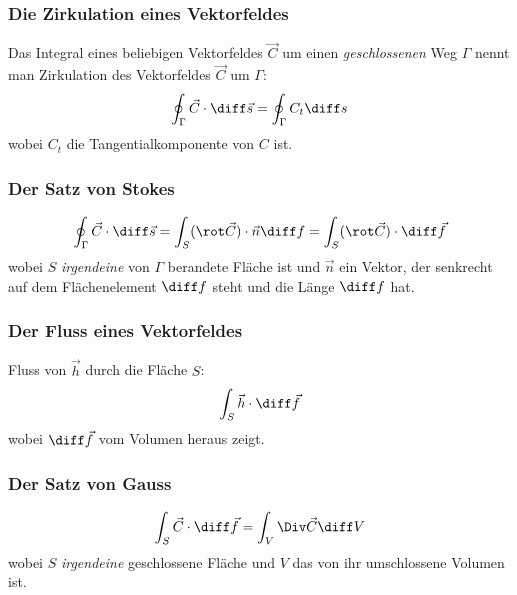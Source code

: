 		
		\subsubsection{Die Zirkulation eines Vektorfeldes} %
			
			Das Integral eines beliebigen Vektorfeldes $\vec{C}$ um einen \emph{geschlossenen} Weg $\Gamma$ nennt man Zirkulation des Vektorfeldes $\vec{C}$ um $\Gamma$:
			\[
				\oint_{\Gamma} \vec{C} \cdot \diff \vec{s} = \oint_{\Gamma} C_t \diff s
			\]
			wobei $C_t$ die Tangentialkomponente von $C$ ist.
			
		
		\subsubsection{Der Satz von Stokes} %
			
			\[
				\oint_{\Gamma} \vec{C} \cdot \diff \vec{s} = \int_S (\rot \vec{C} ) \cdot \vec{n} \diff f = \int_S (\rot \vec{C} ) \cdot \diff \vec{f}
			\]
			wobei $S$ \emph{irgendeine} von $\Gamma$ berandete Fläche ist und $\vec{n}$ ein Vektor, der senkrecht auf dem Flächenelement $\diff f$ steht und die Länge $\diff f$ hat.
			
		
		\subsubsection{Der Fluss eines Vektorfeldes} %
			
			Fluss von $\vec{h}$ durch die Fläche $S$:
			\[
				\int_S \vec{h} \cdot \diff \vec{f}
			\]
			wobei $\diff \vec{f}$ vom Volumen heraus zeigt.
			
		
		\subsubsection{Der Satz von Gauss} %
			
			\[
				\int_S \vec C \cdot \diff \vec f = \int_V \Div \vec C \diff V
			\]
			wobei $S$ \emph{irgendeine} geschlossene Fläche und $V$ das von ihr umschlossene Volumen ist.
			
		
